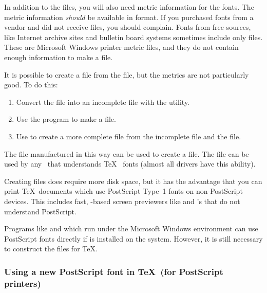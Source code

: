 In addition to the  files, you will also need metric information
for the fonts.  The metric information {\em should\/} be available in
 format.  If you purchased fonts from a vendor and did not receive
 files, you should complain.  Fonts from free sources, like
Internet archive sites and bulletin board systems sometimes include only
 files.  
These are Microsoft Windows
printer metric files, and they do not contain enough information to 
make a  file.  

It is possible to create a  file from the 
file, but the metrics are not particularly good.  To do this:

\begin{enumerate}
  \item Convert the  file into an incomplete  file
        with the  utility.
  \item Use the  program to make a  file.  
  \item Use  to create a more complete  file
        from the incomplete  file and
        the  file.  
\end{enumerate}

The  file manufactured in this way can be
used to create a  file.
The  file can be used by any \dvidriver\ that understands
\TeX\  fonts (almost all drivers have this ability).

Creating  files does require more disk space, but it has the
advantage that you can print \TeX\ documents which use PostScript Type~1
fonts on non-PostScript devices.  This includes fast, -based
screen previewers like  and \emTeX's 
that do not understand PostScript.

Programs like  and  which 
run under
the Microsoft Windows environment can use PostScript fonts directly if
 is installed on the system.  However, it is
still necessary to construct the  files for \TeX.

\subsubsection{Using a new PostScript font in \protect\TeX\ (for
PostScript printers)}

